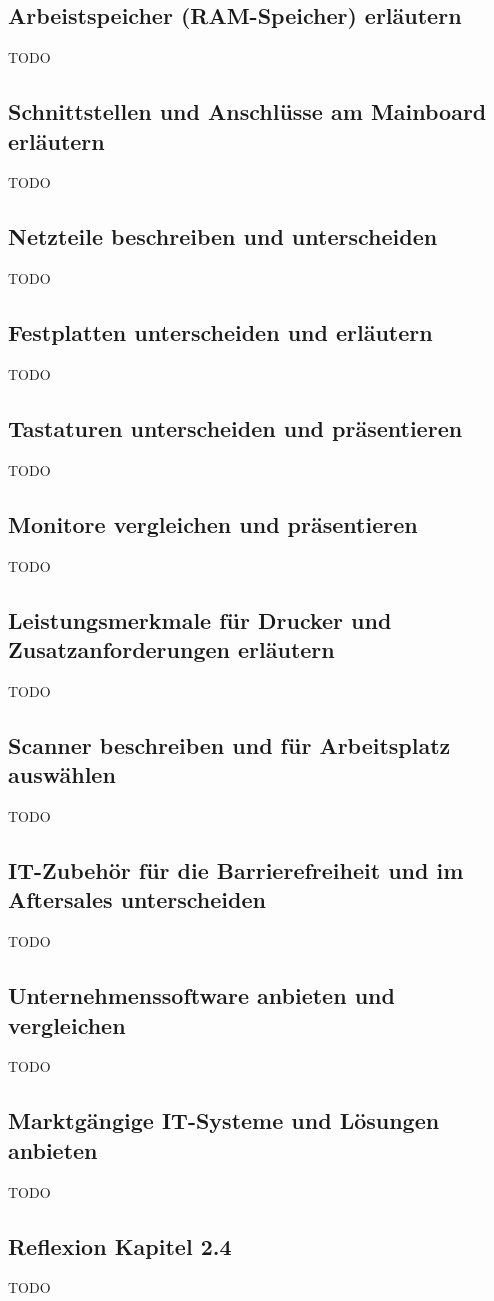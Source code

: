 \documentclass[11pt]{article}
\begin{document}
\subsection{Arbeistspeicher (RAM-Speicher) erläutern}
    TODO
\subsection{Schnittstellen und Anschlüsse am Mainboard erläutern}
    TODO
\subsection{Netzteile beschreiben und unterscheiden}
    TODO
\subsection{Festplatten unterscheiden und erläutern}
    TODO
\subsection{Tastaturen unterscheiden und präsentieren}
    TODO
\subsection{Monitore vergleichen und präsentieren}
    TODO
\subsection{Leistungsmerkmale für Drucker und Zusatzanforderungen erläutern}
    TODO
\subsection{Scanner beschreiben und für Arbeitsplatz auswählen}
    TODO
\subsection{IT-Zubehör für die Barrierefreiheit und im Aftersales unterscheiden}
    TODO
\subsection{Unternehmenssoftware anbieten und vergleichen}
    TODO
\subsection{Marktgängige IT-Systeme und Lösungen anbieten}
    TODO
\subsection*{Reflexion Kapitel 2.4}
    TODO
\end{document}
